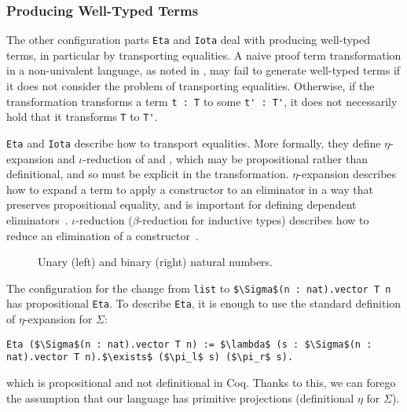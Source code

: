 \subsubsection{Producing Well-Typed Terms}
\label{sec:equality}

The other configuration parts \lstinline{Eta} and \lstinline{Iota} deal with producing well-typed terms,
in particular by transporting equalities.
A naive proof term transformation in a non-univalent language, as noted in \citet{tabareau2019marriage},
may fail to generate well-typed terms if it does not consider the problem of transporting equalities.
Otherwise, if the transformation transforms a term \lstinline{t : T} to some \lstinline{t' : T'}, it does not necessarily
hold that it transforms \lstinline{T} to \lstinline{T'}.

\lstinline{Eta} and \lstinline{Iota} describe how to transport equalities.
More formally, they define $\eta$-expansion and $\iota$-reduction of \A and \B,
which may be propositional rather than definitional, and so must be explicit in the transformation.
$\eta$-expansion describes how to expand a term to apply a constructor to an eliminator in a way that preserves propositional equality,
and is important for defining dependent eliminators~\cite{nlab:eta-conversion}.
$\iota$-reduction ($\beta$-reduction for inductive types) describes how to reduce an elimination of a constructor~\cite{nlab:beta-reduction}.

\begin{figure*}
\begin{minipage}{0.48\textwidth}
   
\end{minipage}
\hfill
\begin{minipage}{0.48\textwidth}
   
\end{minipage}
\vspace{-0.3cm}
\caption{Unary (left) and binary (right) natural numbers.}
\label{fig:nattobin}
\end{figure*}

The configuration for the change from \lstinline{list} to \lstinline{$\Sigma$(n : nat).vector T n} has propositional \lstinline{Eta}.
To describe \lstinline{Eta}, it is enough to use the standard definition of $\eta$-expansion for $\Sigma$:

\begin{lstlisting}
Eta ($\Sigma$(n : nat).vector T n) := $\lambda$ (s : $\Sigma$(n : nat).vector T n).$\exists$ ($\pi_l$ s) ($\pi_r$ s).
\end{lstlisting}
which is propositional and not definitional in Coq.
Thanks to this, we can forego the assumption that our language has primitive projections (definitional $\eta$ for $\Sigma$).

